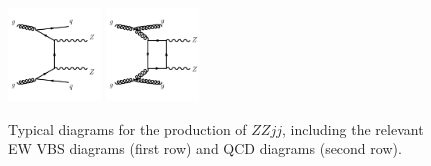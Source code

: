 \begin{figure}[!htbp]
\begin{center}
\includegraphics[width=0.22\textwidth]{figures/diagram/diagram-QCDZZjj-gg.pdf}
\includegraphics[width=0.22\textwidth]{figures/diagram/diagram-QCDZZjj-box.pdf}\\
\end{center}
\caption{Typical diagrams for the production of $ZZjj$, including the relevant EW VBS diagrams (first row) and QCD diagrams (second row).}
\label{fig:diagram}
\end{figure}
